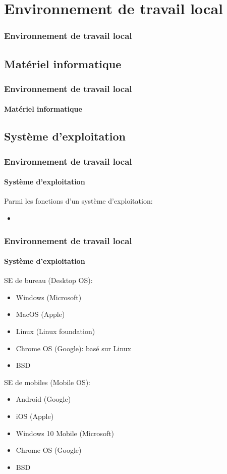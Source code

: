 \documentclass{beamer}
\begin{document}
\section{Environnement de travail local}

\begin{frame}
\frametitle{Environnement de travail local}

\end{frame}

\subsection{Matériel informatique}

\begin{frame}
\frametitle{Environnement de travail local}
\framesubtitle{Matériel informatique}

\end{frame}

\subsection{Système d'exploitation}

\begin{frame}
\frametitle{Environnement de travail local}
\framesubtitle{Système d'exploitation}

Parmi les fonctions d'un système d'exploitation: 
\begin{itemize}
	\item 
\end{itemize}

\end{frame}

\begin{frame}
\frametitle{Environnement de travail local}
\framesubtitle{Système d'exploitation}

SE de bureau (Desktop OS):
\begin{itemize}
	\item Windows (Microsoft)
	\item MacOS (Apple)
	\item Linux (Linux foundation)
	\item Chrome OS (Google): basé sur Linux
	\item BSD
\end{itemize}

SE de mobiles (Mobile OS): 
\begin{itemize}
	\item Android (Google)
	\item iOS (Apple)
	\item Windows 10 Mobile (Microsoft) 
	\item Chrome OS (Google)
	\item BSD
\end{itemize}

\end{frame}
\end{document}
